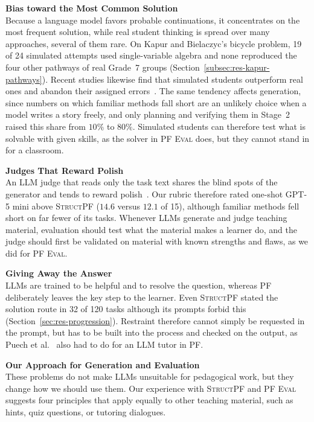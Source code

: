 \textbf{Bias toward the Most Common Solution}\\[0.2em]
Because a language model favors probable continuations, it concentrates on the most frequent solution, while real student thinking is spread over many approaches, several of them rare. On Kapur and Bielaczyc's bicycle problem, 19 of 24 simulated attempts used single-variable algebra and none reproduced the four other pathways of real Grade~7 groups (Section~\ref{subsec:res-kapur-pathways}). Recent studies likewise find that simulated students outperform real ones and abandon their assigned errors~\cite{srivatsa2025abilities,do2026faithfulness,scarlatos2026simstudents}. The same tendency affects generation, since numbers on which familiar methods fall short are an unlikely choice when a model writes a story freely, and only planning and verifying them in Stage~2 raised this share from $10\%$ to $80\%$. Simulated students can therefore test what is solvable with given skills, as the solver in \textsc{PF Eval} does, but they cannot stand in for a classroom.

\textbf{Judges That Reward Polish}\\[0.2em]
An LLM judge that reads only the task text shares the blind spots of the generator and tends to reward polish~\cite{zheng2023judging}. Our rubric therefore rated one-shot GPT-5 mini above \textsc{StructPF} ($14.6$ versus $12.1$ of 15), although familiar methods fell short on far fewer of its tasks. Whenever LLMs generate and judge teaching material, evaluation should test what the material makes a learner do, and the judge should first be validated on material with known strengths and flaws, as we did for \textsc{PF Eval}.

\textbf{Giving Away the Answer}\\[0.2em]
LLMs are trained to be helpful and to resolve the question, whereas PF deliberately leaves the key step to the learner. Even \textsc{StructPF} stated the solution route in 32 of 120 tasks although its prompts forbid this (Section~\ref{sec:res-progression}). Restraint therefore cannot simply be requested in the prompt, but has to be built into the process and checked on the output, as Puech et al.~\cite{puech2025} also had to do for an LLM tutor in PF.

\textbf{Our Approach for Generation and Evaluation}\\[0.2em]
These problems do not make LLMs unsuitable for pedagogical work, but they change how we should use them. Our experience with \textsc{StructPF} and \textsc{PF Eval} suggests four principles that apply equally to other teaching material, such as hints, quiz questions, or tutoring dialogues.

